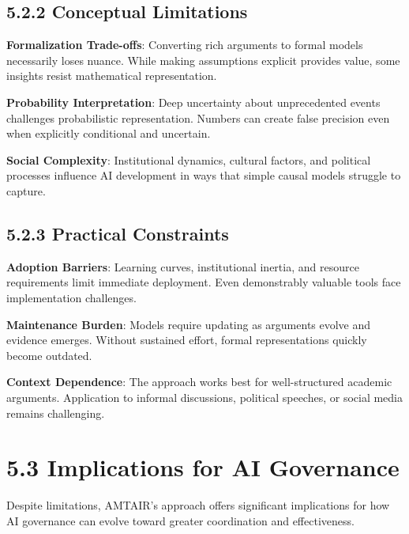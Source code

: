 \documentclass[
  11pt,
  letterpaper,
]{book}
\begin{document}
\subsection*{5.2.2 Conceptual
Limitations}\label{sec-conceptual-limitations}

\textbf{Formalization Trade-offs}: Converting rich arguments to formal
models necessarily loses nuance. While making assumptions explicit
provides value, some insights resist mathematical representation.

\textbf{Probability Interpretation}: Deep uncertainty about
unprecedented events challenges probabilistic representation. Numbers
can create false precision even when explicitly conditional and
uncertain.

\textbf{Social Complexity}: Institutional dynamics, cultural factors,
and political processes influence AI development in ways that simple
causal models struggle to capture.

\subsection*{5.2.3 Practical
Constraints}\label{sec-practical-constraints}

\textbf{Adoption Barriers}: Learning curves, institutional inertia, and
resource requirements limit immediate deployment. Even demonstrably
valuable tools face implementation challenges.

\textbf{Maintenance Burden}: Models require updating as arguments evolve
and evidence emerges. Without sustained effort, formal representations
quickly become outdated.

\textbf{Context Dependence}: The approach works best for well-structured
academic arguments. Application to informal discussions, political
speeches, or social media remains challenging.

\section*{5.3 Implications for AI
Governance}\label{sec-governance-implications}


Despite limitations, AMTAIR's approach offers significant implications
for how AI governance can evolve toward greater coordination and
effectiveness.
\end{document}
